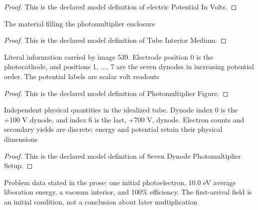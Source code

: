 \begin{proof}
  This is the declared model definition of electric Potential In Volts.
\end{proof}
\begin{definition}
  \label{def:physics:phyx-mini-0539:phyxminiproblems-problemphyxmini0539-tubeinteriormedium}
  The material filling the photomultiplier enclosure
\end{definition}
\begin{proof}
  This is the declared model definition of Tube Interior Medium.
\end{proof}
\begin{definition}
  \label{def:physics:phyx-mini-0539:phyxminiproblems-problemphyxmini0539-photomultiplierfigure}
  Literal information carried by image 539. Electrode position 0 is the photocathode, and positions 1, ..., 7 are the seven dynodes in increasing potential order. The potential labels are scalar volt readouts
\end{definition}
\begin{proof}
  This is the declared model definition of Photomultiplier Figure.
\end{proof}
\begin{definition}
  \label{def:physics:phyx-mini-0539:phyxminiproblems-problemphyxmini0539-sevendynodephotomultipliersetup}
  Independent physical quantities in the idealized tube. Dynode index 0 is the +100 V dynode, and index 6 is the last, +700 V, dynode. Electron counts and secondary yields are discrete; energy and potential retain their physical dimensions
\end{definition}
\begin{proof}
  This is the declared model definition of Seven Dynode Photomultiplier Setup.
\end{proof}
\begin{definition}
  \label{def:physics:phyx-mini-0539:phyxminiproblems-problemphyxmini0539-matchesphotomultiplierproblemdata}
  Problem data stated in the prose: one initial photoelectron, 10.0 eV average liberation energy, a vacuum interior, and 100\% efficiency. The first-arrival field is an initial condition, not a conclusion about later multiplication
\end{definition}
